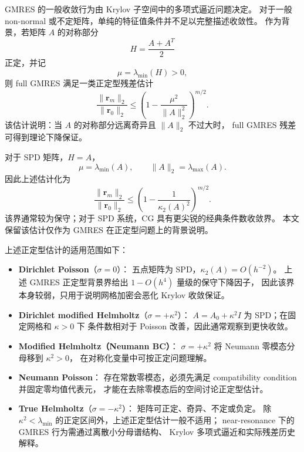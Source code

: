 \begin{remark}
  \label{rem:gmres_positive_background}
  GMRES 的一般收敛行为由 Krylov 子空间中的多项式逼近问题决定。
  对于一般 non-normal 或不定矩阵，单纯的特征值条件并不足以完整描述收敛性。
  作为背景，若矩阵 $A$ 的对称部分
  \[
    H=\frac{A+A^T}{2}
  \]
  正定，并记
  \[
    \mu=\lambda_{\min}(H)>0,
  \]
  则 full GMRES 满足一类正定型残差估计
  \begin{equation}
    \frac{\|\mathbf{r}_m\|_2}{\|\mathbf{r}_0\|_2}
    \le
    \left(
      1-\frac{\mu^2}{\|A\|_2^2}
    \right)^{m/2}.
    \label{eq:gmres_bound}
  \end{equation}
  该估计说明：当 $A$ 的对称部分远离奇异且 $\|A\|_2$ 不过大时，
  full GMRES 残差可得到理论下降保证。

  对于 SPD 矩阵，$H=A$，
  \[
    \mu=\lambda_{\min}(A),
    \qquad
    \|A\|_2=\lambda_{\max}(A).
  \]
  因此上述估计化为
  \[
    \frac{\|\mathbf{r}_m\|_2}{\|\mathbf{r}_0\|_2}
    \le
    \left(
      1-\frac{1}{\kappa_2(A)^2}
    \right)^{m/2}.
  \]
  该界通常较为保守；对于 SPD 系统，CG 具有更尖锐的经典条件数收敛界。
  本文保留该估计仅作为 GMRES 在正定型问题上的背景说明。

  上述正定型估计的适用范围如下：
  \begin{itemize}[itemsep=2pt]
    \item \textbf{Dirichlet Poisson}（$\sigma=0$）：
          五点矩阵为 SPD，$\kappa_2(A)=O(h^{-2})$。
          上述 GMRES 正定型背景界给出 $1-O(h^4)$ 量级的保守下降因子，
          因此该界本身较弱，只用于说明网格加密会恶化 Krylov 收敛保证。
    \item \textbf{Dirichlet modified Helmholtz}（$\sigma=+\kappa^2$）：
          $A=A_0+\kappa^2I$ 为 SPD；在固定网格和 $\kappa>0$ 下
          条件数相对于 Poisson 改善，因此通常观察到更快收敛。
    \item \textbf{Modified Helmholtz（Neumann BC）}：
          $\sigma=+\kappa^2$ 将 Neumann 零模态分母移到 $\kappa^2>0$，
          在对称化变量中可按正定问题理解。
    \item \textbf{Neumann Poisson}：
          存在常数零模态，必须先满足 compatibility condition 并固定零均值代表元，
          才能在去除零模态后的空间讨论正定型估计。
    \item \textbf{True Helmholtz}（$\sigma=-\kappa^2$）：
          矩阵可正定、奇异、不定或负定。
          除 $\kappa^2<\lambda_{\min}$ 的正定区间外，上述正定型估计一般不适用；
          near-resonance 下的 GMRES 行为需通过离散小分母谱结构、
          Krylov 多项式逼近和实际残差历史解释。
  \end{itemize}
\end{remark}

